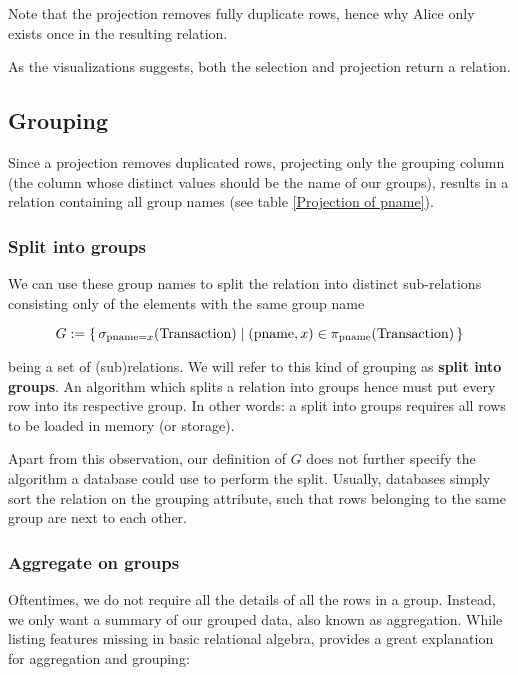 Note that the projection removes fully duplicate rows, hence why Alice only exists once in
the resulting relation.

As the visualizations suggests, both the selection and projection return a relation.

\subsection{Grouping} \label{Grouping}

Since a projection removes duplicated rows, projecting only
the grouping column (the column whose distinct values should be the name of our groups),
results in a relation containing all group names (see table \ref{Projection of pname}).

\subsubsection{Split into groups} \label{Split into groups}

We can use these group names to split the relation into distinct sub-relations consisting
only of the elements with the same group name

\[
    G := \set{\sigma_{\text{pname}=x}(\text{Transaction})
        | (\text{pname}, x) \in \pi_{\text{pname}}(\text{Transaction})}
\]

being a set of (sub)relations. We will refer to this kind of grouping as
\textbf{split into groups}. An algorithm which splits a relation into groups hence
must put every row into its respective group. In other words: a
split into groups requires all rows to be loaded in memory (or storage).

Apart from this observation, our definition of $G$ does not further specify the algorithm
a database could use to perform the split. Usually,
databases simply sort the relation on the grouping attribute, such that
rows belonging to the same group are next to each other.

\subsubsection{Aggregate on groups} \label{Aggregate on groups}

Oftentimes, we do not require all the details of all the rows in a group.
Instead, we only want a summary of our grouped data, also known as aggregation.
While listing features missing in basic relational algebra, \cite{Aren22}
provides a great explanation for aggregation and grouping:

